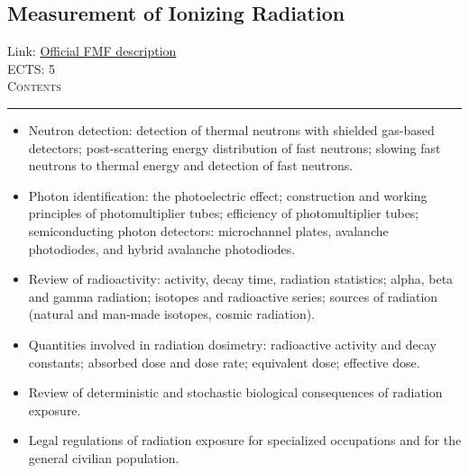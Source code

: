 \documentclass[11pt, a4paper]{article}
\newenvironment{course}[3]{
\subsection{#1}%
Link: \href{#2}{Official FMF description}\\%
ECTS: #3%
\vspace{1ex}
\\
{\large \textsc{Contents}}\\[-0.9ex]%
\rule{\textwidth}{0.5pt}
\vspace{-3ex}
}
{}
\newenvironment{chapter}[1]{
\begin{tcolorbox}[title=#1, breakable]
}
{\end{tcolorbox}}
\begin{document}
\begin{course}{Measurement of Ionizing Radiation}{https://www.fmf.uni-lj.si/en/study-physics/programmes/1fiz/2020/7000777/courses/1446/}{5}
\begin{chapter}{Particle identification}
\begin{itemize}
            \item Neutron detection: detection of thermal neutrons with shielded gas-based detectors; post-scattering energy distribution of fast neutrons; slowing fast neutrons to thermal energy and detection of fast neutrons.

            \item Photon identification: the photoelectric effect; construction and working principles of photomultiplier tubes; efficiency of photomultiplier tubes; semiconducting photon detectors: microchannel plates, avalanche photodiodes, and hybrid avalanche photodiodes.
        
        \end{itemize}
    \end{chapter}

    \begin{chapter}{Radiation safety}
        \begin{itemize}
        
            \item Review of radioactivity: activity, decay time, radiation statistics; alpha, beta and gamma radiation; isotopes and radioactive series; sources of radiation (natural and man-made isotopes, cosmic radiation).

            \item Quantities involved in radiation dosimetry: radioactive activity and decay constants; absorbed dose and dose rate; equivalent dose; effective dose.

            \item Review of deterministic and stochastic biological consequences of radiation exposure.

            \item Legal regulations of radiation exposure for specialized occupations and for the general civilian population.

        \end{itemize}
    \end{chapter}
\end{course}
\end{document}
